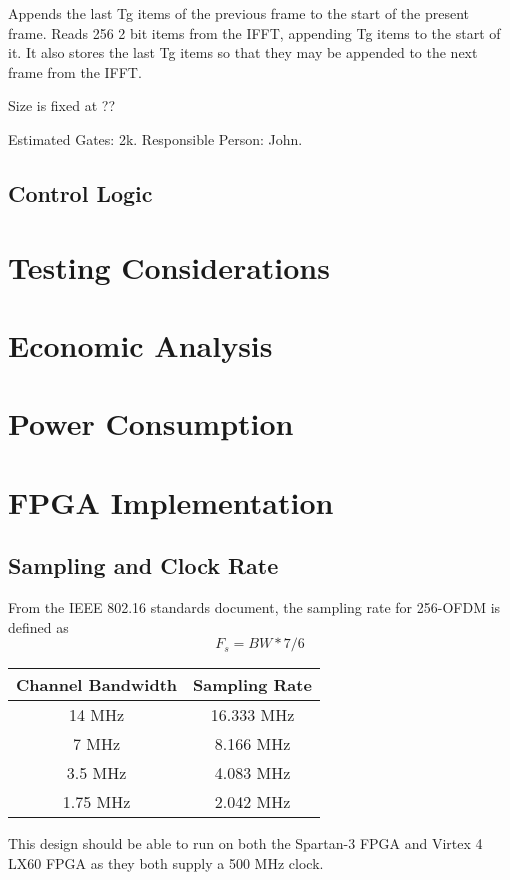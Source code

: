 \documentclass[10pt,twocolumn]{article}
\begin{document}
	Appends the last Tg items of the previous frame to the start of the
	present frame.  Reads 256 2 bit items from the IFFT, appending Tg
	items to the start of it. It also stores the last Tg items so that
	they may be appended to the next frame from the IFFT.

	Size is fixed at ??

	Estimated Gates: 2k.
	Responsible Person: John.

	\subsection{Control Logic}
	\label{sec:ctrl}

\section{Testing Considerations}
\section{Economic Analysis}
\section{Power Consumption}
\section{FPGA Implementation}
  \subsection{Sampling and Clock Rate}
    From the IEEE 802.16 standards document, the sampling rate for 256-OFDM is defined as
    \begin{equation}
    F_s = BW * 7/6
    \end{equation}
  
  \begin{center}
  \begin{tabular}{c|c}
  Channel Bandwidth & Sampling Rate \\ \hline
  14 MHz & 16.333 MHz \\
  7 MHz & 8.166 MHz \\
  3.5 MHz & 4.083 MHz \\
  1.75 MHz & 2.042 MHz
  \end{tabular}
  \end{center}
  
  This design should be able to run on both the Spartan-3 FPGA and Virtex 4 LX60
  FPGA as they both supply a 500 MHz clock.
  
\end{document}

